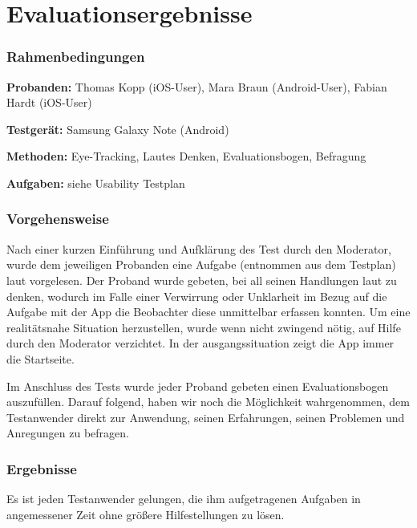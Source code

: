 \section{Evaluationsergebnisse}

\subsubsection*{Rahmenbedingungen}
\textbf{Probanden:} Thomas Kopp (iOS-User), Mara Braun (Android-User), Fabian Hardt (iOS-User)

\textbf{Testgerät:} Samsung Galaxy Note (Android)

\textbf{Methoden:} Eye-Tracking, Lautes Denken, Evaluationsbogen, Befragung

\textbf{Aufgaben:} siehe Usability Testplan

\subsubsection*{Vorgehensweise}

Nach einer kurzen Einführung und Aufklärung des Test durch den Moderator, wurde dem jeweiligen Probanden eine Aufgabe (entnommen aus dem Testplan) laut vorgelesen. Der Proband wurde gebeten, bei all seinen Handlungen laut zu denken, wodurch im Falle einer Verwirrung oder Unklarheit im Bezug auf die Aufgabe mit der App die Beobachter diese unmittelbar erfassen konnten. Um eine realitätsnahe Situation herzustellen, wurde wenn nicht zwingend nötig, auf Hilfe durch den Moderator verzichtet. In der \gls{ausgang}ssituation zeigt die App immer die Startseite.

Im Anschluss des Tests wurde jeder Proband gebeten einen Evaluationsbogen auszufüllen. Darauf folgend, haben wir noch die Möglichkeit wahrgenommen, dem Testanwender direkt zur Anwendung, seinen Erfahrungen, seinen Problemen und Anregungen zu befragen.

\subsubsection*{Ergebnisse}

Es ist jeden Testanwender gelungen, die ihm aufgetragenen Aufgaben in angemessener Zeit ohne größere Hilfestellungen zu lösen.

